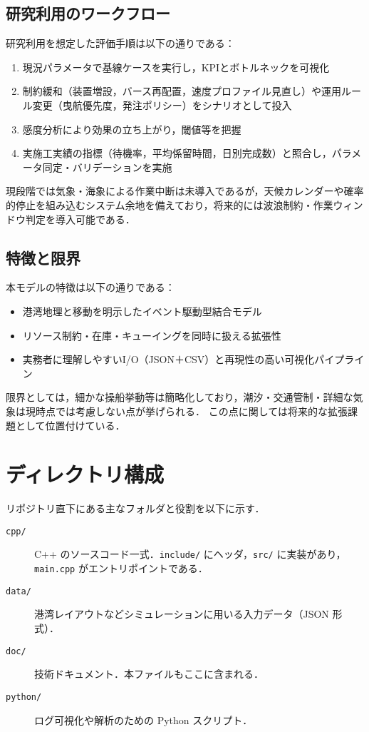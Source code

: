 \documentclass[10pt,letterpaper]{jsarticle}
\begin{document}
\subsection{研究利用のワークフロー}
研究利用を想定した評価手順は以下の通りである：

\begin{enumerate}
  \item 現況パラメータで基線ケースを実行し，KPIとボトルネックを可視化
  \item 制約緩和（装置増設，バース再配置，速度プロファイル見直し）や運用ルール変更（曳航優先度，発注ポリシー）をシナリオとして投入
  \item 感度分析により効果の立ち上がり，閾値等を把握
  \item 実施工実績の指標（待機率，平均係留時間，日別完成数）と照合し，パラメータ同定・バリデーションを実施
\end{enumerate}

現段階では気象・海象による作業中断は未導入であるが，天候カレンダーや確率的停止を組み込むシステム余地を備えており，将来的には波浪制約・作業ウィンドウ判定を導入可能である．

\subsection{特徴と限界}
本モデルの特徴は以下の通りである：

\begin{itemize}
  \item 港湾地理と移動を明示したイベント駆動型結合モデル
  \item リソース制約・在庫・キューイングを同時に扱える拡張性
  \item 実務者に理解しやすいI/O（JSON＋CSV）と再現性の高い可視化パイプライン
\end{itemize}

限界としては，細かな操船挙動等は簡略化しており，潮汐・交通管制・詳細な気象は現時点では考慮しない点が挙げられる．
この点に関しては将来的な拡張課題として位置付けている．

\section{ディレクトリ構成}
リポジトリ直下にある主なフォルダと役割を以下に示す．
\begin{description}
  \item[\texttt{cpp/}] C++ のソースコード一式．\texttt{include/} にヘッダ，\texttt{src/} に実装があり，\texttt{main.cpp} がエントリポイントである．
  \item[\texttt{data/}] 港湾レイアウトなどシミュレーションに用いる入力データ（JSON 形式）．
  \item[\texttt{doc/}] 技術ドキュメント．本ファイルもここに含まれる．
  \item[\texttt{python/}] ログ可視化や解析のための Python スクリプト．
\end{description}
\end{document}
